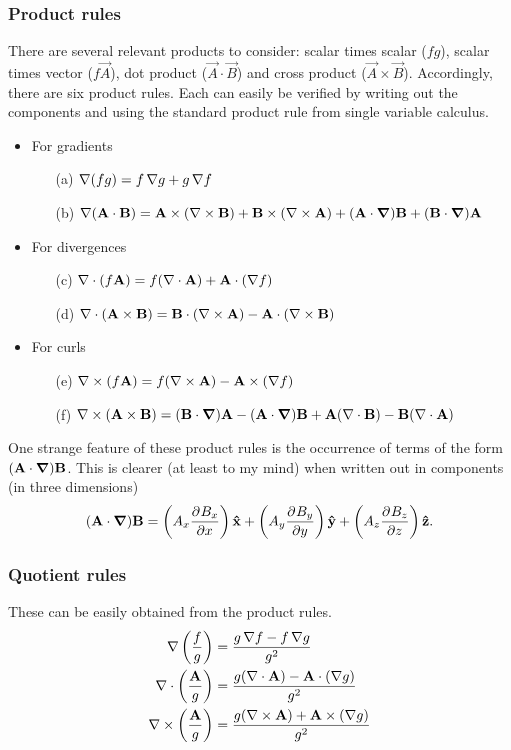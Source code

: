 \subsubsection{Product rules}
There are several relevant products to consider: scalar times scalar ($fg$), scalar times vector ($f \vec{A}$), dot product ($\vec{A}\cdot \vec{B}$) and cross product ($\vec{A}\times \vec{B}$). Accordingly, there are six product rules. Each can easily be verified by writing out the components and using the standard product rule from single variable calculus.
\begin{itemize}
\item For gradients
\begin{itemize}
\item[(a)] $\mathop{}\! \nabla(fg) = f\mathop{}\! \nabla g + g\mathop{}\! \nabla f$
\item[(b)] $\mathop{}\! \nabla(\bm{\mathrm{A}}\cdot \bm{\mathrm{B}}) = \bm{\mathrm{A}}\times(\mathop{}\! \nabla\times \bm{\mathrm{B}}) + \bm{\mathrm{B}}\times(\mathop{}\! \nabla\times\bm{\mathrm{A}}) + (\bm{\mathrm{A}}\cdot\operatorname{\bm{\mathrm{\nabla}}})\bm{\mathrm{B}} +(\bm{\mathrm{B}}\cdot\operatorname{\bm{\mathrm{\nabla}}})\bm{\mathrm{A}}$
\end{itemize}
\item For divergences
\begin{itemize}
\item[(c)] $\nabla\cdot(f\bm{\mathrm{A}}) = f(\nabla\cdot\bm{\mathrm{A}}) + \bm{\mathrm{A}}\cdot(\mathop{}\! \nabla f)$
\item[(d)] $\nabla\cdot(\bm{\mathrm{A}}\times \bm{\mathrm{B}}) = \bm{\mathrm{B}}\cdot(\mathop{}\! \nabla\times \bm{\mathrm{A}}) - \bm{\mathrm{A}}\cdot(\mathop{}\! \nabla\times\bm{\mathrm{B}})$
\end{itemize}
\item For curls
\begin{itemize}
\item[(e)] $\mathop{}\! \nabla\times(f\bm{\mathrm{A}}) = f(\mathop{}\! \nabla\times \bm{\mathrm{A}}) - \bm{\mathrm{A}}\times (\mathop{}\! \nabla f)$
\item[(f)] $\mathop{}\! \nabla\times(\bm{\mathrm{A}}\times \bm{\mathrm{B}}) = (\bm{\mathrm{B}}\cdot\operatorname{\bm{\mathrm{\nabla}}})\bm{\mathrm{A}} - (\bm{\mathrm{A}}\cdot\operatorname{\bm{\mathrm{\nabla}}})\bm{\mathrm{B}} + \bm{\mathrm{A}}(\nabla\cdot \bm{\mathrm{B}}) - \bm{\mathrm{B}}(\nabla\cdot \bm{\mathrm{A}})$
\end{itemize}
\end{itemize}
One strange feature of these product rules is the occurrence of terms of the form $(\bm{\mathrm{A}}\cdot\operatorname{\bm{\mathrm{\nabla}}})\bm{\mathrm{B}}$. This is clearer (at least to my mind) when written out in components (in three dimensions)
\[ (\bm{\mathrm{A}}\cdot\operatorname{\bm{\mathrm{\nabla}}})\bm{\mathrm{B}} = \left(A_x   \frac{\partial{^{}}B_x}{\partial{{x}^{}}} \right)\bm{\mathrm{\hat{x}}} + \left(A_y   \frac{\partial{^{}}B_y}{\partial{{y}^{}}} \right)\bm{\mathrm{\hat{y}}} + \left(A_z   \frac{\partial{^{}}B_z}{\partial{{z}^{}}} \right)\bm{\mathrm{\hat{z}}}. \]

\subsubsection{Quotient rules}
These can be easily obtained from the product rules.
\begin{align*}
\mathop{}\! \nabla \left(\frac{f}{g}\right) &= \frac{g\mathop{}\! \nabla f - f\mathop{}\! \nabla g}{g^2} \\
\nabla\cdot \left(\frac{\bm{\mathrm{A}}}{g}\right) &= \frac{g(\nabla\cdot \bm{\mathrm{A}}) - \bm{\mathrm{A}}\cdot (\mathop{}\! \nabla g)}{g^2} \\
\mathop{}\! \nabla\times \left(\frac{\bm{\mathrm{A}}}{g}\right) &= \frac{g(\mathop{}\! \nabla\times\bm{\mathrm{A}}) + \bm{\mathrm{A}}\times(\mathop{}\! \nabla g)}{g^2}
\end{align*}

